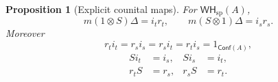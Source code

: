 \documentclass[oneside]{article}
\newcommand{\Conf}{\mathsf{Conf}}
\newcommand{\WH}{\mathsf{WH}}
\theoremstyle{plain}
\newtheorem{proposition}[theorem]{Proposition}
\theoremstyle{definition}
\theoremstyle{remark}
\begin{document}
\begin{proposition}[Explicit counital maps]
\label{prop:cgqg-incidence-counital-maps}
    For \(\WH_{\mathrm{sp}}(A)\),
    \begin{equation}
        m(1\otimes S)\Delta=i_tr_t,
        \qquad
        m(S\otimes1)\Delta=i_sr_s.
        \label{eq:cgqg-explicit-counital-incidence}
    \end{equation}
    Moreover
    \begin{equation}
        r_ti_t=r_si_s=r_si_t=r_ti_s=1_{\Conf(A)},
        \label{eq:cgqg-base-cross-splittings}
    \end{equation}
    \begin{align}
        Si_t&=i_s,
        &
        Si_s&=i_t,
        \label{eq:cgqg-antipode-exchanges-base-inclusions}\\
        r_tS&=r_s,
        &
        r_sS&=r_t.
        \label{eq:cgqg-antipode-exchanges-base-retractions}
    \end{align}
\end{proposition}
\end{document}

